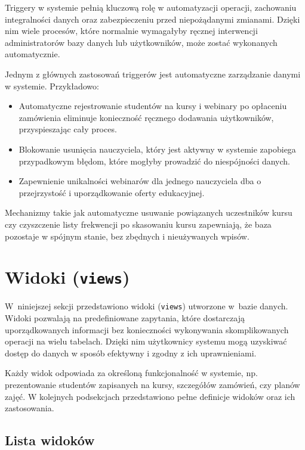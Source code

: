 \documentclass[12pt]{article}
\begin{document}
\noindent Triggery w systemie pełnią kluczową rolę w automatyzacji operacji, zachowaniu integralności danych oraz zabezpieczeniu przed niepożądanymi zmianami. Dzięki nim wiele procesów, które normalnie wymagałyby ręcznej interwencji administratorów bazy danych lub użytkowników, może zostać wykonanych automatycznie.

\noindent Jednym z głównych zastosowań triggerów jest automatyczne zarządzanie danymi w systemie. Przykładowo:
\begin{itemize}
    \item Automatyczne rejestrowanie studentów na kursy i webinary po opłaceniu zamówienia eliminuje konieczność ręcznego dodawania użytkowników, przyspieszając cały proces.
    \item Blokowanie usunięcia nauczyciela, który jest aktywny w systemie zapobiega przypadkowym błędom, które mogłyby prowadzić do niespójności danych.
    \item Zapewnienie unikalności webinarów dla jednego nauczyciela dba o przejrzystość i uporządkowanie oferty edukacyjnej.
\end{itemize}

\noindent Mechanizmy takie jak automatyczne usuwanie powiązanych uczestników kursu czy czyszczenie listy frekwencji po skasowaniu kursu zapewniają, że baza pozostaje w spójnym stanie, bez zbędnych i nieużywanych wpisów.



\newpage
\section{Widoki (\texttt{views})}
\label{sec:views}

\noindent W~niniejszej sekcji przedstawiono widoki (\texttt{views}) utworzone w~bazie danych.  
Widoki pozwalają na predefiniowane zapytania, które dostarczają uporządkowanych informacji bez konieczności wykonywania skomplikowanych operacji na wielu tabelach.  
Dzięki nim użytkownicy systemu mogą uzyskiwać dostęp do danych w sposób efektywny i zgodny z ich uprawnieniami.

\noindent Każdy widok odpowiada za określoną funkcjonalność w systemie, np. prezentowanie studentów zapisanych na kursy, szczegółów zamówień, czy planów zajęć. W kolejnych podsekcjach przedstawiono pełne definicje widoków oraz ich zastosowania.

\subsection{Lista widoków}
\end{document}
